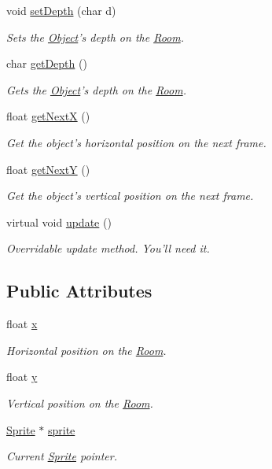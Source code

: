 \begin{DoxyCompactItemize}
void \hyperlink{class_object_a7d97667046ee84c23f4f362892bf4e33}{set\-Depth} (char d)
\begin{DoxyCompactList}\small\item\em Sets the \hyperlink{class_object}{Object}'s depth on the \hyperlink{class_room}{Room}. \end{DoxyCompactList}\item 
char \hyperlink{class_object_aad6045382d08dc0bf4fc8a35915560ea}{get\-Depth} ()
\begin{DoxyCompactList}\small\item\em Gets the \hyperlink{class_object}{Object}'s depth on the \hyperlink{class_room}{Room}. \end{DoxyCompactList}\item 
float \hyperlink{class_object_a9397ff68bd3fdba963dfb054ea5e62c1}{get\-Next\-X} ()
\begin{DoxyCompactList}\small\item\em Get the object's horizontal position on the next frame. \end{DoxyCompactList}\item 
float \hyperlink{class_object_afda996a7119562f31a67e85029567ba7}{get\-Next\-Y} ()
\begin{DoxyCompactList}\small\item\em Get the object's vertical position on the next frame. \end{DoxyCompactList}\item 
virtual void \hyperlink{class_object_a4abd48bacb1b004c8ac891597c831f77}{update} ()
\begin{DoxyCompactList}\small\item\em Overridable update method. You'll need it. \end{DoxyCompactList}\end{DoxyCompactItemize}
\subsection*{Public Attributes}
\begin{DoxyCompactItemize}
\item 
float \hyperlink{class_object_a99addca3b5d96c214fa8f90474224699}{x}
\begin{DoxyCompactList}\small\item\em Horizontal position on the \hyperlink{class_room}{Room}. \end{DoxyCompactList}\item 
float \hyperlink{class_object_a2870044ec214e97550ee28db89c6382a}{y}
\begin{DoxyCompactList}\small\item\em Vertical position on the \hyperlink{class_room}{Room}. \end{DoxyCompactList}\item 
\hyperlink{class_sprite}{Sprite} $\ast$ \hyperlink{class_object_ad936466f3f6b6e8fa401842c573b44e6}{sprite}
\begin{DoxyCompactList}\small\item\em Current \hyperlink{class_sprite}{Sprite} pointer. \end{DoxyCompactList}\end{DoxyCompactItemize}
